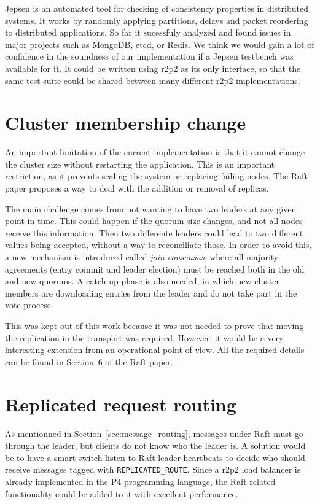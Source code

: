 Jepsen\cite{jepsen} is an automated tool for checking of consistency properties in distributed systems.
It works by randomly applying partitions, delays and packet reordering to distributed applications.
So far it sucessfuly analyzed and found issues in major projects such as MongoDB, etcd, or Redis.
We think we would gain a lot of confidence in the soundness of our implementation if a Jepsen testbench was available for it.
It could be written using \gls{r2p2} as its only interface, so that the same test suite could be shared between many different \gls{r2p2} implementations.

\section{Cluster membership change}

An important limitation of the current implementation is that it cannot change the cluster size without restarting the application.
This is an important restriction, as it prevents scaling the system or replacing failing nodes.
The Raft paper\cite{raft} proposes a way to deal with the addition or removal of replicas.

The main challenge comes from not wanting to have two leaders at any given point in time.
This could happen if the quorum size changes, and not all nodes receive this information.
Then two differente leaders could lead to two different values being accepted, without a way to reconciliate those.
In order to avoid this, a new mechanism is introduced called \emph{join consensus}, where all majority agreements (entry commit and leader election) must be reached both in the old and new quorums.
A catch-up phase is also needed, in which new cluster members are downloading entries from the leader and do not take part in the vote process.

This was kept out of this work because it was not needed to prove that moving the replication in the transport was required.
However, it would be a very interesting extension from an operational point of view.
All the required details can be found in Section~6 of the Raft paper\cite[p.~10]{raft}.


\section{Replicated request routing}

As mentionned in Section~\ref{sec:message_routing}, messages under Raft must go through the leader, but clients do not know who the leader is.
A solution would be to have a smart switch listen to Raft leader heartbeats to decide who should receive messages tagged with \texttt{REPLICATED\_ROUTE}.
Since a \gls{r2p2} load balancer is already implemented in the P4 programming language\cite{r2p2}, the Raft-related functionality could be added to it with excellent performance.


